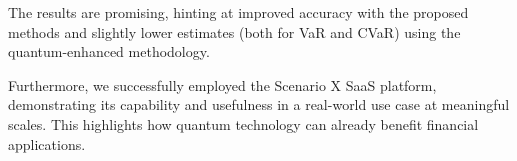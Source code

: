 \documentclass{article}
\begin{document}
The results are promising, hinting at improved accuracy with the proposed methods and slightly lower estimates (both for VaR and CVaR) using the quantum-enhanced methodology.

Furthermore, we successfully employed the Scenario X SaaS platform, demonstrating its capability and usefulness in a real-world use case at meaningful scales. This highlights how quantum technology can already benefit financial applications.




\end{document}

